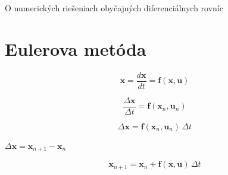 \documentclass[a4paper, 10pt, ]{article}
\newcommand{\bm}[1]{\mathbf{#1}}
\newcommand{\der}[2]{\frac{d #1}{d #2}}
\newcommand{\diff}[2]{\frac{\Delta #1}{\Delta #2}}
\theoremstyle{definition}
\begin{document}
\begin{flushleft}
	O numerických riešeniach obyčajných diferenciálnych rovníc
\end{flushleft}

\bigskip

\normalsize
\normalfont



\section{Eulerova metóda}

\begin{equation}
    \dot{\bm{x}} = \der{\bm{x}}{t} = \bm{f}(\bm{x}, \bm{u})
\end{equation}

\begin{equation}
    \diff{\bm{x}}{t} = \bm{f}(\bm{x}_{n}, \bm{u}_{n})
\end{equation}

\begin{equation}
    \Delta \bm{x} = \bm{f}(\bm{x}_{n}, \bm{u}_{n}) \, \Delta t
\end{equation}

$\Delta \bm{x} = \bm{x}_{n + 1} - \bm{x}_{n}$

\begin{equation}
    \bm{x}_{n + 1} = \bm{x}_{n} + \bm{f}(\bm{x}, \bm{u}) \, \Delta t
\end{equation}
\end{document}
